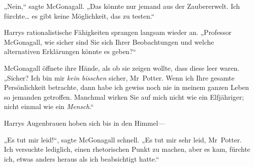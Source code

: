 „Nein,“ sagte McGonagall. „Das könnte nur jemand aus der Zaubererwelt. Ich fürchte… es gibt keine Möglichkeit, das zu testen.“

Harrys rationalistische Fähigkeiten sprangen langsam wieder an. „Professor McGonagall, wie sicher sind Sie sich Ihrer Beobachtungen und welche alternativen Erklärungen könnte es geben?“

McGonagall öffnete ihre Hände, als ob sie zeigen wollte, dass diese leer waren. „Sicher? Ich bin mir \emph{kein bisschen} sicher, Mr~Potter. Wenn ich Ihre gesamte Persönlichkeit betrachte, dann habe ich gewiss noch nie in meinem ganzen Leben so jemanden getroffen. Manchmal wirken Sie auf mich nicht wie ein Elfjähriger; nicht einmal wie ein \emph{Mensch}.“

Harrys Augenbrauen hoben sich bis in den Himmel—

„Es tut mir leid!“, sagte McGonagall schnell. „Es tut mir sehr leid, Mr~Potter. Ich versuchte lediglich, einen rhetorischen Punkt zu machen, aber es kam, fürchte ich, etwas anders heraus als ich beabsichtigt hatte.“

